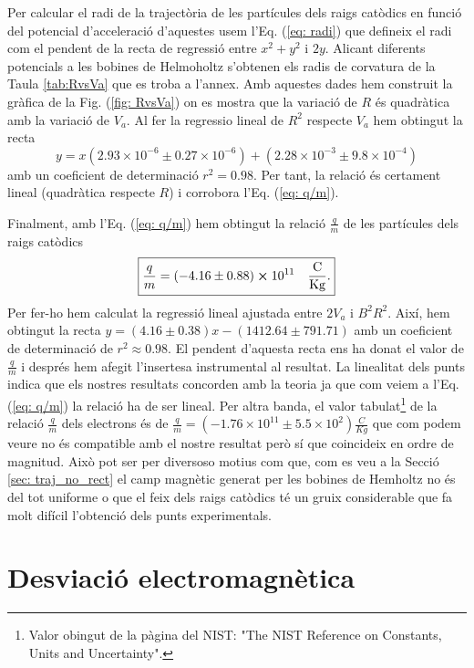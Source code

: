 \documentclass[11pt]{article}
\begin{document}
Per calcular el radi de la trajectòria de les partícules dels raigs catòdics en funció del potencial d'acceleració d'aquestes usem l'Eq. (\ref{eq: radi}) que defineix el radi com el pendent de la recta de regressió entre $x^2+y^2$ i $2y$. Alicant diferents potencials a les bobines de Helmoholtz s'obtenen els radis de corvatura de la Taula \ref{tab:RvsVa} que es troba a l'annex. Amb aquestes dades hem construit la gràfica de la Fig. (\ref{fig: RvsVa}) on es mostra que la variació de $R$ és quadràtica amb la variació de $V_a$. Al fer la regressio lineal de $R^2$ respecte $V_a$ hem obtingut la recta
\begin{equation}
    y=x(2.93\times10^{-6}\pm0.27\times10^{-6})+(2.28\times 10^{-3}\pm9.8\times10^{-4})
\end{equation}  
amb un coeficient de determinació $r^2=0.98$. Per tant, la relació és certament lineal (quadràtica respecte $R$) i corrobora l'Eq. (\ref{eq: q/m}).


Finalment, amb l'Eq. (\ref{eq: q/m}) hem obtingut la relació $\frac{q}{m}$ de les partícules dels raigs catòdics
\[
\boxed{\frac{q}{m}=(-4.16\pm0.88)\cross10^{11}\quad \mathrm{\frac{C}{Kg}.}}
\]
Per fer-ho hem calculat la regressió lineal ajustada entre $2V_a$ i $B^2R^2$. Així, hem obtingut la recta $y=(4.16\pm0.38)x - (1412.64\pm791.71)$ amb un coeficient de determinació de $r^2\approx0.98$. El pendent d'aquesta recta ens ha donat el valor de $\frac{q}{m}$ i després hem afegit l'insertesa instrumental al resultat. La linealitat dels punts indica que els nostres resultats concorden amb la teoria ja que com veiem a l'Eq. (\ref{eq: q/m}) la relació ha de ser lineal. 
Per altra banda, el valor tabulat\footnote{Valor obingut de la pàgina del NIST: "The NIST Reference on Constants, Units and Uncertainty".} de la relació $\frac{q}{m}$ dels electrons és de $\frac{q}{m}=(-1.76\times10^{11}\pm5.5\times10^{2}) \frac{C}{Kg}$ que    com podem veure no és compatible amb el nostre resultat però sí que coincideix en ordre de magnitud. Això pot ser per diversoso motius com que, com es veu a la Secció \ref{sec: traj_no_rect} el camp magnètic generat per les bobines de Hemholtz no és del tot uniforme o que el feix dels raigs catòdics té un gruix considerable que fa molt difícil l'obtenció dels punts experimentals.


\section{Desviació electromagnètica}\label{sec: desv_em}
\end{document}
